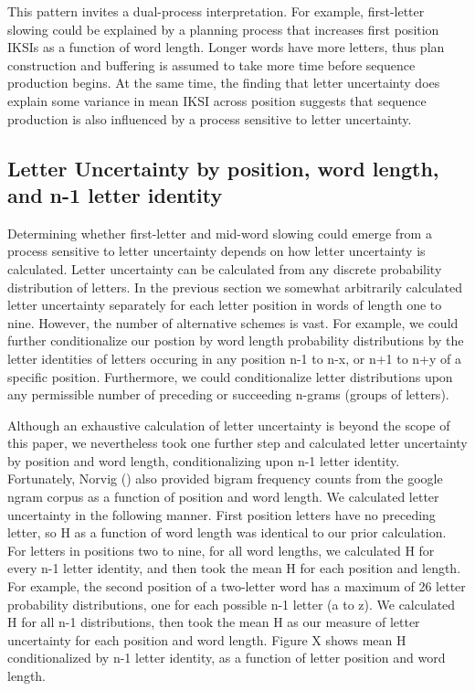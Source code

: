 \documentclass[floatsintext,man]{apa6}
\theoremstyle{definition}
\theoremstyle{definition}
\theoremstyle{definition}
\theoremstyle{remark}
\begin{document}
This pattern invites a dual-process interpretation. For example,
first-letter slowing could be explained by a planning process that
increases first position IKSIs as a function of word length. Longer
words have more letters, thus plan construction and buffering is assumed
to take more time before sequence production begins. At the same time,
the finding that letter uncertainty does explain some variance in mean
IKSI across position suggests that sequence production is also
influenced by a process sensitive to letter uncertainty.

\subsection{Letter Uncertainty by position, word length, and n-1 letter
identity}\label{letter-uncertainty-by-position-word-length-and-n-1-letter-identity}

Determining whether first-letter and mid-word slowing could emerge from
a process sensitive to letter uncertainty depends on how letter
uncertainty is calculated. Letter uncertainty can be calculated from any
discrete probability distribution of letters. In the previous section we
somewhat arbitrarily calculated letter uncertainty separately for each
letter position in words of length one to nine. However, the number of
alternative schemes is vast. For example, we could further
conditionalize our postion by word length probability distributions by
the letter identities of letters occuring in any position n-1 to n-x, or
n+1 to n+y of a specific position. Furthermore, we could conditionalize
letter distributions upon any permissible number of preceding or
succeeding n-grams (groups of letters).

Although an exhaustive calculation of letter uncertainty is beyond the
scope of this paper, we nevertheless took one further step and
calculated letter uncertainty by position and word length,
conditionalizing upon n-1 letter identity. Fortunately, Norvig () also
provided bigram frequency counts from the google ngram corpus as a
function of position and word length. We calculated letter uncertainty
in the following manner. First position letters have no preceding
letter, so H as a function of word length was identical to our prior
calculation. For letters in positions two to nine, for all word lengths,
we calculated H for every n-1 letter identity, and then took the mean H
for each position and length. For example, the second position of a
two-letter word has a maximum of 26 letter probability distributions,
one for each possible n-1 letter (a to z). We calculated H for all n-1
distributions, then took the mean H as our measure of letter uncertainty
for each position and word length. Figure X shows mean H conditionalized
by n-1 letter identity, as a function of letter position and word
length.
\end{document}
